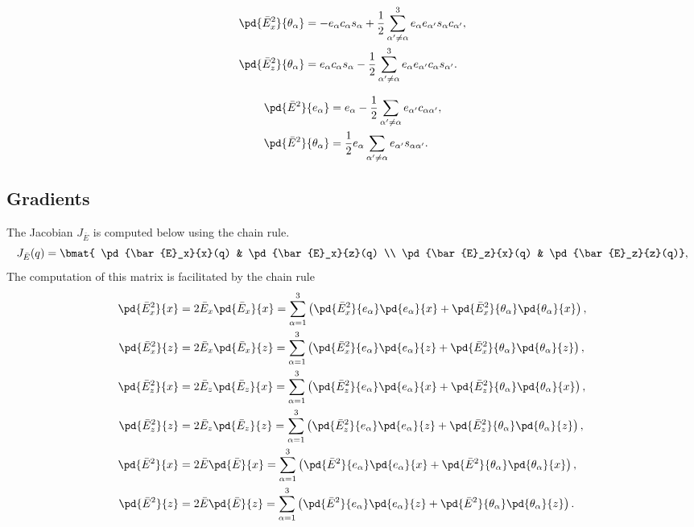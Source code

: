 \begin{align*}
    \pd{\bar{E}_x^2}{\theta_\alpha} &= -e_\alpha c_\alpha s_\alpha +
    \frac{1}{2}\sum_{\alpha^\prime \neq \alpha}^3 e_\alpha e_{\alpha^\prime}
    s_\alpha c_{\alpha^\prime}, \\
    \pd{\bar{E}_z^2}{\theta_\alpha} &= e_\alpha c_\alpha s_\alpha -
    \frac{1}{2}\sum_{\alpha^\prime \neq \alpha}^3 e_\alpha e_{\alpha^\prime}
    c_\alpha s_{\alpha^\prime}.
\end{align*}

\begin{align*}
    \pd{\bar{E}^2}{e_\alpha} &= e_\alpha - \frac{1}{2}\sum_{\alpha^\prime \neq
    \alpha} e_{\alpha^\prime}c_{\alpha \alpha^\prime},\\
    \pd{\bar{E}^2}{\theta_\alpha} &= \frac{1}{2} e_\alpha \sum_{\alpha^\prime \neq
\alpha} e_{\alpha^\prime} s_{\alpha \alpha^\prime}.
\end{align*}


\subsection{Gradients}
\label{ssec:gradients}
%
The Jacobian $J_{\bar{E}}$ is computed below using the chain rule.
\renewcommand*{\arraystretch}{1.5}
\[
    J_{\bar{E}}(q) = \bmat{ \pd{\bar{E}_x}{x}(q) & \pd{\bar{E}_x}{z}(q) \\
    \pd{\bar{E}_z}{x}(q) & \pd{\bar{E}_z}{z}(q)},
\]
%
The computation of this matrix is facilitated by the chain rule
%
\begin{align*}
    \pd{\bar{E}_x^2}{x} &= 2\bar{E}_x \pd{\bar{E}_x}{x} = \sum_{\alpha=1}^3
    \left(\pd{\bar{E}_x^2}{e_\alpha}\pd{e_\alpha}{x} +
    \pd{\bar{E}_x^2}{\theta_\alpha}\pd{\theta_\alpha}{x}\right), \\
    \pd{\bar{E}_x^2}{z} &= 2\bar{E}_x \pd{\bar{E}_x}{z} =\sum_{\alpha=1}^3
    \left(\pd{\bar{E}_x^2}{e_\alpha}\pd{e_\alpha}{z} +
    \pd{\bar{E}_x^2}{\theta_\alpha}\pd{\theta_\alpha}{z}\right), \\
    \pd{\bar{E}_z^2}{x} &= 2\bar{E}_z \pd{\bar{E}_z}{x} = \sum_{\alpha=1}^3
    \left(\pd{\bar{E}_z^2}{e_\alpha}\pd{e_\alpha}{x} +
    \pd{\bar{E}_z^2}{\theta_\alpha}\pd{\theta_\alpha}{x}\right), \\
    \pd{\bar{E}_z^2}{z} &= 2\bar{E}_z \pd{\bar{E}_z}{z} = \sum_{\alpha=1}^3
    \left(\pd{\bar{E}_z^2}{e_\alpha}\pd{e_\alpha}{z} +
    \pd{\bar{E}_z^2}{\theta_\alpha}\pd{\theta_\alpha}{z}\right), \\
    \pd{\bar{E}^2}{x} &= 2\bar{E} \pd{\bar{E}}{x} = \sum_{\alpha=1}^3
    \left(\pd{\bar{E}^2}{e_\alpha}\pd{e_\alpha}{x} +
    \pd{\bar{E}^2}{\theta_\alpha}\pd{\theta_\alpha}{x}\right), \\
    \pd{\bar{E}^2}{z} &= 2\bar{E} \pd{\bar{E}}{z} = \sum_{\alpha=1}^3
    \left(\pd{\bar{E}^2}{e_\alpha}\pd{e_\alpha}{z} +
    \pd{\bar{E}^2}{\theta_\alpha}\pd{\theta_\alpha}{z}\right).
\end{align*}
%



